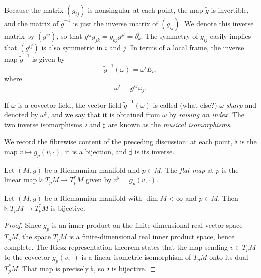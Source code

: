 Because the matrix $(g_{ij})$ is nonsingular at each point, the map $\tilde{g}$ is invertible, and the matrix of $\tilde{g}^{-1}$ is just the inverse matrix of $(g_{ij})$. We denote this inverse matrix by $(g^{ij})$, so that $g^{ij}g_{jk} = g_{kj}g^{jl} = \delta_k^l$. The symmetry of $g_{ij}$ easily implies that $(g^{ij})$ is also symmetric in $i$ and $j$. In terms of a local frame, the inverse map $\tilde{g}^{-1}$ is given by
\[
\tilde{g}^{-1}(\omega) = \omega^i E_i,
\]
where
\begin{equation}
\omega^i = g^{ij}\omega_j. \tag{2.13}
\end{equation}

If $\omega$ is a covector field, the vector field $\tilde{g}^{-1}(\omega)$ is called (what else?) $\omega$ \textit{sharp} and denoted by $\omega^\sharp$, and we say that it is obtained from $\omega$ by \textit{raising an index}. The two inverse isomorphisms $\flat$ and $\sharp$ are known as the \textit{musical isomorphisms}.

We record the fibrewise content of the preceding discussion: at each point, $\flat$ is the map $v \mapsto g_p(v,\cdot)$, it is a bijection, and $\sharp$ is its inverse.

\begin{definition}
\label{def:flat-map}
\leanok
{}
Let $(M,g)$ be a Riemannian manifold and $p \in M$. The \emph{flat map} at $p$ is the linear map $\flat : T_p M \to T_p^* M$ given by $v^\flat = g_p(v, \cdot)$.
\end{definition}

\begin{lemma}
\label{lem:flat-bijective}
\leanok
{}
Let $(M,g)$ be a Riemannian manifold with $\dim M < \infty$ and $p \in M$. Then $\flat : T_p M \to T_p^* M$ is bijective.
\end{lemma}

\begin{proof}
\leanok
{}
Since $g_p$ is an inner product on the finite-dimensional real vector space $T_p M$, the space $T_p M$ is a finite-dimensional real inner product space, hence complete. The Riesz representation theorem states that the map sending $v \in T_p M$ to the covector $g_p(v,\cdot)$ is a linear isometric isomorphism of $T_p M$ onto its dual $T_p^* M$. That map is precisely $\flat$, so $\flat$ is bijective.
\end{proof}


